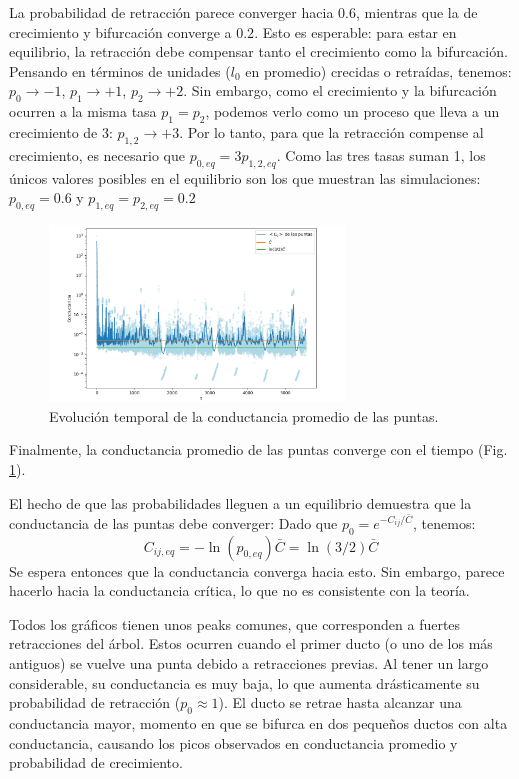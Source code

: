 \documentclass{article}
\begin{document}
La probabilidad de retracción parece converger hacia $0.6$, mientras que la de crecimiento y bifurcación converge a $0.2$. Esto es esperable:
para estar en equilibrio, la retracción debe compensar tanto el crecimiento como la bifurcación. Pensando en términos de unidades ($l_0$ en promedio) crecidas o retraídas,
tenemos: $p_0 \rightarrow -1$, $p_1 \rightarrow +1$, $p_2 \rightarrow +2$. Sin embargo, como el crecimiento y la bifurcación ocurren a la misma tasa $p_1=p_2$, podemos verlo como un proceso
que lleva a un crecimiento de 3: $p_{1,2} \rightarrow +3$. Por lo tanto, para que la retracción compense al crecimiento, es necesario que $p_{0,eq} = 3p_{1,2,eq}$. Como las tres tasas suman 1, 
los únicos valores posibles en el equilibrio son los que muestran las simulaciones: $p_{0,eq}=0.6$ y $p_{1,eq}=p_{2,eq}=0.2$

\begin{figure}[h!]
    \centering
    \includegraphics[width=0.7\textwidth]{graficos_inst/Cij_vs_tiempo.png}
    \caption{Evolución temporal de la conductancia promedio de las puntas.}
    \label{fig:evolucion_conductancia}
\end{figure}
Finalmente, la conductancia promedio de las puntas converge con el tiempo (Fig. \ref{fig:evolucion_conductancia}).

El hecho de que las probabilidades lleguen a un equilibrio demuestra que la conductancia de las puntas debe converger: Dado que $p_0 = e^{-C_{ij}/\bar C}$, tenemos: 
$$ C_{ij,eq} = -\ln(p_{0,eq})\bar C = \ln(3/2)\bar C $$
Se espera entonces que la conductancia converga hacia esto. Sin embargo, parece hacerlo hacia la conductancia crítica, lo que no es consistente con la teoría. 

Todos los gráficos tienen unos peaks comunes, que corresponden a fuertes retracciones del árbol. Estos ocurren cuando el primer ducto (o uno de los más antiguos) se vuelve una punta debido a retracciones previas. Al tener un largo considerable, su conductancia es muy baja, lo que aumenta drásticamente su probabilidad de retracción ($p_0 \approx 1$). El ducto se retrae hasta alcanzar una conductancia mayor, momento en que se bifurca en dos pequeños ductos con alta conductancia, causando los picos observados en conductancia promedio y probabilidad de crecimiento.
\end{document}
